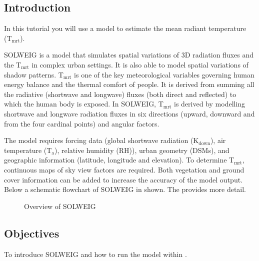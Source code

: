 \documentclass[letterpaper,10pt,english]{sphinxmanual}
\begin{document}
\subsection{Introduction}
\label{\detokenize{Tutorials/IntroductionToSolweig:introduction}}
In this tutorial you will use a model  to estimate the mean radiant
temperature (T$_{\text{mrt}}$).

SOLWEIG is a model that simulates spatial variations of 3D radiation
fluxes and the T$_{\text{mrt}}$ in complex urban settings. It is also able
to model spatial variations of shadow patterns. T$_{\text{mrt}}$ is one of
the key meteorological variables governing human energy balance and the
thermal comfort of people. It is derived from summing all the radiative
(shortwave and longwave) fluxes (both direct and reflected) to which the
human body is exposed. In SOLWEIG, T$_{\text{mrt}}$ is derived by modelling
shortwave and longwave radiation fluxes in six directions (upward,
downward and from the four cardinal points) and angular factors.

The model requires  forcing data (global shortwave
radiation (K$_{\text{down}}$), air temperature (T$_{\text{a}}$), relative humidity (RH)),
urban geometry (DSMs), and geographic information (latitude, longitude
and elevation). To determine T$_{\text{mrt}}$, continuous maps of sky view
factors are required. Both vegetation and ground cover information can
be added to increase the accuracy of the model output. Below
a schematic flowchart of SOLWEIG in shown. The {\hyperref[\detokenize{OtherManuals/SOLWEIG:solweigmanual}]{}} provides more
detail.

\begin{figure}[htbp]
\centering
\capstart

\noindent{}
\caption{Overview of SOLWEIG}\label{\detokenize{Tutorials/IntroductionToSolweig:id1}}\end{figure}


\subsection{Objectives}
\label{\detokenize{Tutorials/IntroductionToSolweig:objectives}}
To introduce SOLWEIG and how to run the model within {\hyperref[\detokenize{index:index-page}]{}}.
\end{document}
